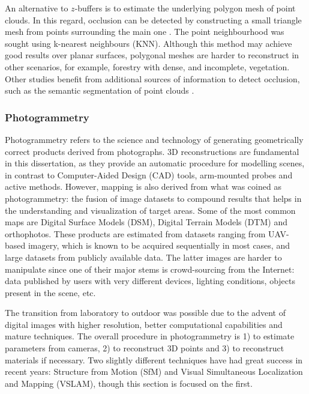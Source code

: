 An alternative to $z$-buffers is to estimate the underlying polygon mesh of point clouds. In this regard, occlusion can be detected by constructing a small triangle mesh from points surrounding the main one \cite{jurado_multispectral_2020}. The point neighbourhood was sought using k-nearest neighbours (KNN). Although this method may achieve good results over planar surfaces, polygonal meshes are harder to reconstruct in other scenarios, for example, forestry with dense, and incomplete, vegetation. Other studies benefit from additional sources of information to detect occlusion, such as the semantic segmentation of point clouds \cite{schneider_fusing_2010}. 

\subsubsection{Photogrammetry}

Photogrammetry refers to the science and technology of generating geometrically correct products derived from photographs. 3D reconstructions are fundamental in this dissertation, as they provide an automatic procedure for modelling scenes, in contrast to Computer-Aided Design (CAD) tools, arm-mounted probes and active methods. However, mapping is also derived from what was coined as photogrammetry: the fusion of image datasets to compound results that helps in the understanding and visualization of target areas. Some of the most common maps are Digital Surface Models (DSM), Digital Terrain Models (DTM) and orthophotos. These products are estimated from datasets ranging from UAV-based imagery, which is known to be acquired sequentially in most cases, and large datasets from publicly available data. The latter images are harder to manipulate since one of their major stems is crowd-sourcing from the Internet: data published by users with very different devices, lighting conditions, objects present in the scene, etc.

The transition from laboratory to outdoor was possible due to the advent of digital images with higher resolution, better computational capabilities and mature techniques. The overall procedure in photogrammetry is 1) to estimate parameters from cameras, 2) to reconstruct 3D points and 3) to reconstruct materials if necessary. Two slightly different techniques have had great success in recent years: Structure from Motion (SfM) and Visual Simultaneous Localization and Mapping (VSLAM), though this section is focused on the first. 

